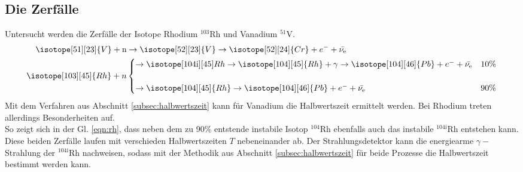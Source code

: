 \subsection{Die Zerfälle}
Untersucht werden die Zerfälle der Isotope Rhodium $^{103}$Rh und Vanadium $^{51}$V.
\begin{align}
    \isotope[51][23]{V} + \text{n} &\to \isotope[52][23]{V} \to \isotope[52][24]{Cr} + e^- + \bar{\nu_{\text{e}}}\\
    \isotope[103][45]{Rh}+n&
    \begin{cases}
        \to \isotope[104\text{i}][45]{Rh} \to \isotope[104][45]{Rh}+\gamma \to \isotope[104][46]{Pb}+e^- + \bar{\nu_{\text{e}}} & 10\%\\\\
        \to \isotope[104][45]{Rh} \to \isotope[104][46]{Pb}+e^- + \bar{\nu_{\text{e}}} & 90\%
    \end{cases}
    \label{eqn:rh}
\end{align}
Mit dem Verfahren aus Abschnitt \ref{subsec:halbwertszeit} kann für Vanadium die 
Halbwertszeit ermittelt werden.
Bei Rhodium treten allerdings Besonderheiten auf.\\
So zeigt sich in der Gl. \ref{eqn:rh}, dass neben dem zu 90\% entstende instabile 
Isotop $^{104}$Rh ebenfalls auch das instabile $^{104\text{i}}$Rh entstehen kann. 
Diese beiden Zerfälle laufen mit verschieden Halbwertszeiten $T$ nebeneinander ab. 
Der Strahlungsdetektor kann die energiearme $\gamma-$Strahlung der $^{104\text{i}}$Rh 
nachweisen, sodass mit der Methodik aus Abschnitt \ref{subsec:halbwertszeit} für 
beide Prozesse die Halbwertszeit bestimmt werden kann.